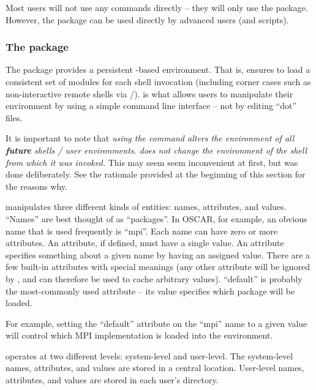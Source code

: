 Most users will not use any  commands directly -- they
will only use the  package.  However, the
 package can be used directly by advanced users (and
scripts).


\subsubsection{The  package}

The  package provides a persistent
-based environment.  That is,  ensures
to load a consistent set of modules for each shell invocation
(including corner cases such as non-interactive remote shells via
/).   is what allows users to
manipulate their environment by using a simple command line interface
-- not by editing ``dot'' files.

It is important to note that {\em using the  command
  alters the environment of all {\bf future} shells / user
  environments.   does not change the environment of the
  shell from which it was invoked.}  This may seem seem inconvenient
at first, but was done deliberately.  See the rationale provided at
the beginning of this section for the reasons why.

 manipulates three different kinds of entities:
names, attributes, and values.  ``Names'' are best thought of as
``packages''.  In OSCAR, for example, an obvious name that is used
frequently is ``mpi''.  Each name can have zero or more attributes.
An attribute, if defined, must have a single value.  An attribute
specifies something about a given name by having an assigned value.
There are a few built-in attributes with special meanings (any other
attribute will be ignored by , and can therefore be
used to cache arbitrary values).  ``default'' is probably the
most-commonly used attribute -- its value specifies which package will
be loaded.

For example, setting the ``default'' attribute on the ``mpi'' name to
a given value will control which MPI implementation is loaded into the
environment.

 operates at two different levels: system-level and
user-level.  The system-level names, attributes, and values are stored
in a central location.  User-level names, attributes, and values are
stored in each user's  directory.

